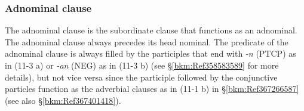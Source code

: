 \subsubsection{Adnominal clause}
\label{bkm:Ref306757474}\hypertarget{RefHeadingToc395697253}{}\label{bkm:Ref366707692}
The adnominal clause is the subordinate clause that functions as an adnominal. The adnominal clause always precedes its head nominal. The predicate of the adnominal clause is always filled by the participles that end with \textit{{}-n} (PTCP) as in (11-3 a) or \textit{{}-an} (NEG) as in (11-3 b) (see §\ref{bkm:Ref358583589} for more details), but not vice versa since the participle followed by the conjunctive particles function as the adverbial clauses as in (11-1 b) in §\ref{bkm:Ref367266587} (see also §\ref{bkm:Ref367401418}).

\tablefirsthead{}

